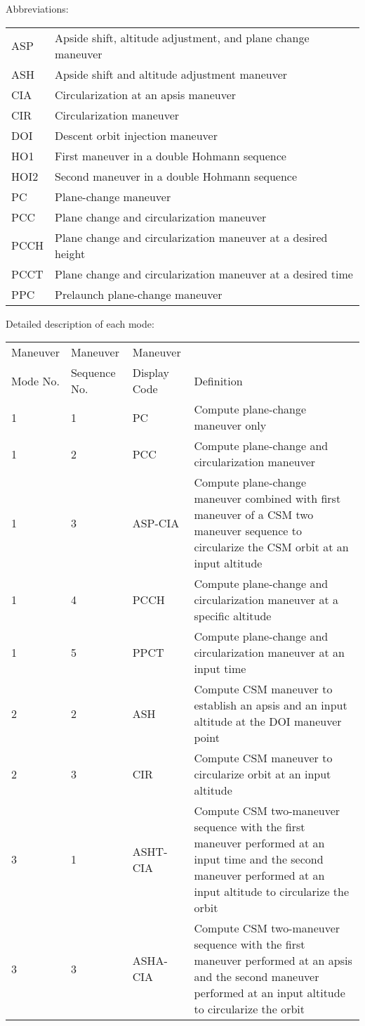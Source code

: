 \documentclass[11pt]{article} %
\begin{document}
Abbreviations:\\

\begin{center}
\begin{tabular}{l l}
ASP&Apside shift, altitude adjustment, and plane change maneuver\\
ASH&Apside shift and altitude adjustment maneuver\\
CIA&Circularization at an apsis maneuver\\
CIR&Circularization maneuver\\
DOI&Descent orbit injection maneuver\\
HO1&First maneuver in a double Hohmann sequence\\
HOI2&Second maneuver in a double Hohmann sequence\\
PC&Plane-change maneuver\\
PCC&Plane change and circularization maneuver\\
PCCH&Plane change and circularization maneuver at a desired height\\
PCCT&Plane change and circularization maneuver at a desired time\\
PPC&Prelaunch plane-change maneuver\\
\end{tabular}
\end{center}
\newpage
Detailed description of each mode:\\
\begin{center}
\begin{tabular}{l l l m{7.3cm}}
Maneuver&Maneuver&Maneuver&\\
Mode No.&Sequence No.&Display Code& Definition\\
\hline
1&1&PC&Compute plane-change maneuver only\\
\hline
1&2&PCC&Compute plane-change and circularization maneuver\\
\hline
1&3&ASP-CIA&Compute plane-change maneuver combined with first maneuver of a CSM two maneuver sequence to circularize the CSM orbit at an input altitude\\
\hline
1&4&PCCH&Compute plane-change and circularization maneuver at a specific altitude\\
\hline
1&5&PPCT&Compute plane-change and circularization maneuver at an input time\\
\hline
2&2&ASH&Compute CSM maneuver to establish an apsis and an input altitude at the DOI maneuver point\\
\hline
2&3&CIR&Compute CSM maneuver to circularize orbit at an input altitude\\
\hline
3&1&ASHT-CIA&Compute CSM two-maneuver sequence with the first maneuver performed at an input time and the second maneuver performed at an input altitude to circularize the orbit\\
\hline
3&3&ASHA-CIA&Compute CSM two-maneuver sequence with the first maneuver performed at an apsis and the second maneuver performed at an input altitude to circularize the orbit\\
\hline
\end{tabular}
\end{center}
\end{document}
